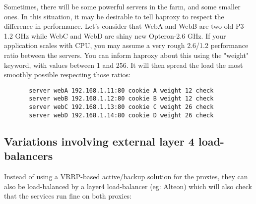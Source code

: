 Sometimes, there will be some powerful servers in the farm, and some smaller
ones. In this situation, it may be desirable to tell haproxy to respect the
difference in performance. Let's consider that WebA and WebB are two old
P3-1.2 GHz while WebC and WebD are shiny new Opteron-2.6 GHz. If your
application scales with CPU, you may assume a very rough 2.6/1.2 performance
ratio between the servers. You can inform haproxy about this using the "weight"
keyword, with values between 1 and 256. It will then spread the load the most
smoothly possible respecting those ratios:

\begin{verbatim}
       server webA 192.168.1.11:80 cookie A weight 12 check
       server webB 192.168.1.12:80 cookie B weight 12 check
       server webC 192.168.1.13:80 cookie C weight 26 check
       server webD 192.168.1.14:80 cookie D weight 26 check
\end{verbatim}

\subsection{Variations involving external layer 4 load-balancers}

Instead of using a VRRP-based active/backup solution for the proxies,
they can also be load-balanced by a layer4 load-balancer (eg: Alteon)
which will also check that the services run fine on both proxies:

